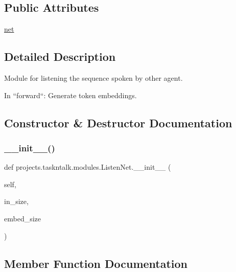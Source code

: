 \subsection*{Public Attributes}
\begin{DoxyCompactItemize}
\item 
\hyperlink{classprojects_1_1taskntalk_1_1modules_1_1ListenNet_a01d428f1730b2a3abf26c86ed72adf1b}{net}
\end{DoxyCompactItemize}


\subsection{Detailed Description}
\begin{DoxyVerb}Module for listening the sequence spoken by other agent.

In ``forward``: Generate token embeddings.
\end{DoxyVerb}
 

\subsection{Constructor \& Destructor Documentation}
\mbox{\label{classprojects_1_1taskntalk_1_1modules_1_1ListenNet_aecba12850e8db36a5a1b4c7c56e29836}} 
\subsubsection{\texorpdfstring{\+\_\+\+\_\+init\+\_\+\+\_\+()}{\_\_init\_\_()}}
{\footnotesize\ttfamily def projects.\+taskntalk.\+modules.\+Listen\+Net.\+\_\+\+\_\+init\+\_\+\+\_\+ (\begin{DoxyParamCaption}\item[{}]{self,  }\item[{}]{in\+\_\+size,  }\item[{}]{embed\+\_\+size }\end{DoxyParamCaption})}



\subsection{Member Function Documentation}
\mbox{\label{classprojects_1_1taskntalk_1_1modules_1_1ListenNet_ad2d13c813b626f6b92bd17f6693c179c}} 
